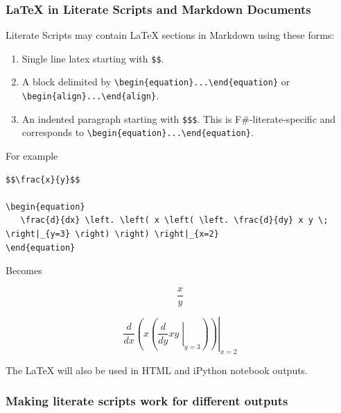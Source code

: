 \documentclass{article}
\begin{document}
\subsubsection*{LaTeX in Literate Scripts and Markdown Documents}



Literate Scripts may contain LaTeX sections in Markdown using these forms:
\begin{enumerate}
\item 

Single line latex starting with \texttt{\$\$}.

\item 

A block delimited by \texttt{{\textbackslash}begin\{equation\}...{\textbackslash}end\{equation\}} or \texttt{{\textbackslash}begin\{align\}...{\textbackslash}end\{align\}}.

\item 

An indented paragraph starting with \texttt{\$\$\$}.  This is F\#-literate-specific and corresponds to
\texttt{{\textbackslash}begin\{equation\}...{\textbackslash}end\{equation\}}.

\end{enumerate}



For example
\begin{lstlisting}
$$\frac{x}{y}$$

\begin{equation}
   \frac{d}{dx} \left. \left( x \left( \left. \frac{d}{dy} x y \; \right|_{y=3} \right) \right) \right|_{x=2}
\end{equation}

\end{lstlisting}


Becomes


\begin{equation}
\frac{x}{y}
\end{equation}




\begin{equation}
   \frac{d}{dx} \left. \left( x \left( \left. \frac{d}{dy} x y \; \right|_{y=3} \right) \right) \right|_{x=2}
\end{equation}




The LaTeX will also be used in HTML and iPython notebook outputs.
\subsubsection*{Making literate scripts work for different outputs}
\end{document}
